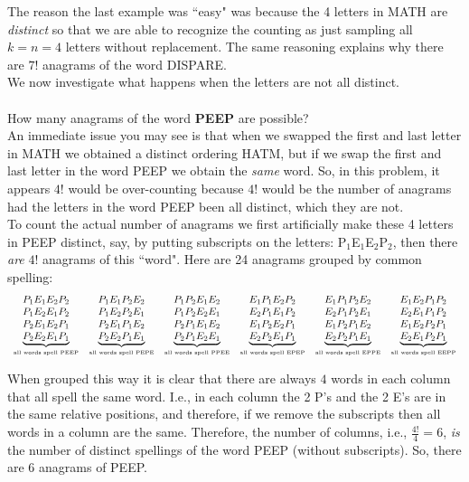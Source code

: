 \documentclass[12pt]{article}
\begin{document}
\newpage

\noindent The reason the last example was ``easy" was because the 4 letters in MATH are {\em distinct} so that we are able to recognize the counting as just sampling all $k=n=4$ letters without replacement.  The same reasoning explains why there are $7!$ anagrams of the word DISPARE.  \\

\noindent We now investigate what happens when the letters are not all distinct.\\

\\
\noindent How many anagrams of the word {\bf PEEP} are possible?\\

\noindent An immediate issue you may see is that when we swapped the first and last letter
in MATH we obtained a distinct ordering HATM, but if we swap the first and last letter in
the word PEEP we obtain the {\em same} word.  So, in this problem, it appears $4!$ would be
over-counting because $4!$ would be the number of anagrams had the letters in the word PEEP
been all distinct, which they are not. \\

\noindent To count the actual number of anagrams we first artificially
make these 4 letters in PEEP distinct, say, by putting subscripts on the letters: P$_1$E$_1$E$_2$P$_2$,
then there {\em are} $4!$ anagrams of this ``word".  Here are 24 anagrams grouped by common spelling:
$$
\begin{array}{cccccc}
P_1E_1E_2P_2 & P_1E_1P_2E_2 & P_1P_2E_1E_2 & E_1P_1E_2P_2 & E_1P_1P_2E_2 & E_1E_2P_1P_2 \\
P_1E_2E_1P_2 & P_1E_2P_2E_1 & P_1P_2E_2E_1 & E_2P_1E_1P_2 & E_2P_1P_2E_1 & E_2E_1P_1P_2 \\
P_2E_1E_2P_1 & P_2E_1P_1E_2 & P_2P_1E_1E_2 & E_1P_2E_2P_1 & E_1P_2P_1E_2 & E_1E_2P_2P_1 \\
\underbrace{P_2E_2E_1P_1}_{\mbox{\tiny all words spell PEEP}} & \underbrace{P_2E_2P_1E_1}_{\mbox{\tiny all words spell PEPE}} & \underbrace{P_2P_1E_2E_1}_{\mbox{\tiny all words spell PPEE}} & \underbrace{E_2P_2E_1P_1}_{\mbox{\tiny all words spell EPEP}} & \underbrace{E_2P_2P_1E_1}_{\mbox{\tiny all words spell EPPE}} & \underbrace{E_2E_1P_2P_1}_{\mbox{\tiny all words spell EEPP}} \end{array}$$

\noindent When grouped this way it is clear that there are always $4$ words in each column that all
spell the same word. I.e., in each column the 2 P's and the 2 E's are in the same relative positions, and therefore, if we remove the subscripts then all words in a column are the same.
Therefore, the number of columns, i.e., $\frac {4!}{4}=6$, {\em is} the number of distinct
spellings of the word PEEP (without subscripts). So, there are 6 anagrams of PEEP.\\
\end{document}
